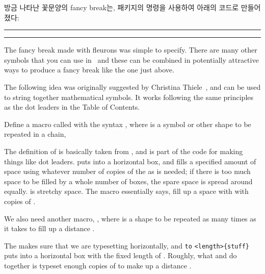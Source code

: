 방금 나타난 꽃문양의 fancy break는,
 패키지의 \cmd{\ding} 명령을 사용하여 아래의 코드로 만들어졌다:
\begin{lcode}
\renewcommand{\pfbreakdisplay}{%
  \ding{167}\quad\ding{167}\quad\ding{167}}
\fancybreak{\pfbreakdisplay}
\end{lcode}

\makeatletter
\newcommand{\motif}[1]{\cleaders\hbox{#1}\hfil}
\newcommand{\chain}[2]{\leavevmode\hbox to #2{\motif{#1}}}
\newcommand{\diamondpattern}{\m@th$\mkern-.6mu \diamond \mkern-.6mu$}
\makeatother

\fancybreak{\chain{\diamondpattern}{0.25\textwidth}}

    The fancy break made with fleurons was simple to specify. There are 
many other symbols that you can
use in \ltx\ and these can be combined in potentially attractive ways to
produce a fancy break like the one just above.

    The following idea was originally suggested by Christina 
Thiele~\cite{ORNAMENTAL}, and can
be used to string together mathematical symbols. It works following the same
principles as the dot leaders in the Table of Contents.

    Define a macro called with the syntax , where
 is a symbol or other shape to be repeated in a chain,
\begin{lcode}
\newcommand{\motif}[1]{\cleaders\hbox{#1}\hfil}
\end{lcode}
The definition of  is basically taken from \tx, and is part of the
code for making things like dot leaders. \cmd{\hbox} puts
 into a horizontal box, and \cmd{\cleaders} fills
a specified amount of space using whatever number of copies of the 
 as is needed; if there is
too much space to be filled by a whole number of boxes, the spare space
is spread around equally. \cmd{\hfil} is stretchy space. The  macro
essentially says, fill up a space with with copies of .

    We also need another macro, , 
where 
is a shape to be repeated as many times as it takes to fill up a distance
.
\begin{lcode}
\newcommand{\chain}[2]{\leavevmode\hbox to #2{\motif{#1}}}
\end{lcode}
The \cmd{\leavevmode} makes sure that we are typesetting horizontally, and
\cmd{\hbox} \verb?to? \verb?<length>{stuff}? puts  into a horizontal 
box with the
fixed length of . Roughly, what  and 
do together is typeset enough copies of  to make up
a distance . 

